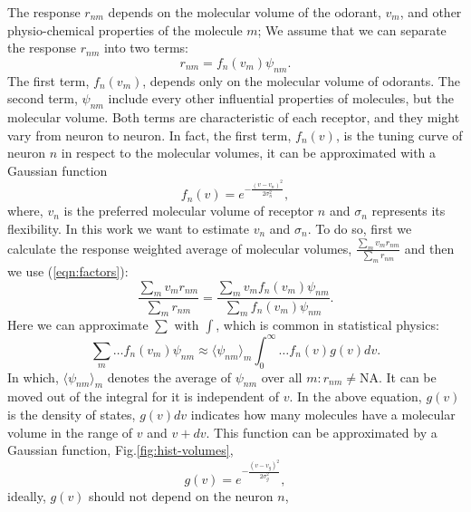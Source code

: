 \documentclass[11pt]{paper} %
\begin{document}
The response $r_{nm}$ depends on the molecular volume of the odorant, $v_m$, 
and other physio-chemical properties of the molecule $m$; 
We assume that we can separate the response $r_{nm}$ into two terms:
\begin{equation}
	r_{nm} = f_n(v_m) \psi_{nm}.
	\label{eqn:factors}
\end{equation}
The first term, $f_n(v_m)$, depends only on the molecular volume of odorants.
The second term, $\psi_{nm}$ include every other influential properties of molecules, but the molecular volume.
Both terms are characteristic of each receptor, and they might vary from neuron to neuron.
In fact, the first term, $f_n(v)$, is the tuning curve of neuron $n$ in respect to the molecular volumes, 
it can be approximated with a Gaussian function
\begin{equation}
	\displaystyle f_n(v) = e^{-\frac{(v-v_n)^2}{2\sigma^2_n}}, 
	\label{eqn:volume-dependence}
\end{equation}
where, $v_n$ is the preferred molecular volume of receptor $n$ and $\sigma_n$ represents its flexibility. 
In this work we want to estimate $v_n$ and $\sigma_n$. 
To do so, first we calculate the response weighted average of molecular volumes, 
$\frac{\sum_{m} v_m r_{nm}}{\sum_{m} r_{nm}}$ and then we use (\ref{eqn:factors}):
\begin{equation}
	\frac{\displaystyle \sum_{m} v_m r_{nm}}{\displaystyle \sum_{m} r_{nm}} = \frac{\displaystyle \sum_{m} v_m f_n(v_m) \psi_{nm}}{\displaystyle \sum_{m} f_n(v_m) \psi_{nm}}.
	\label{eqn:sta}
\end{equation}
Here we can approximate $\sum$ with $\int$, which is common in statistical physics:
\begin{equation}
	\sum_{m} \dots f_n(v_m) \psi_{nm} \approx  \langle \psi_{nm} \rangle_m \int_0^\infty \dots f_n(v) g(v)  dv. 
	\label{eqn:sigma_to_int}
\end{equation}
In which, 
$\langle \psi_{nm} \rangle_m$ denotes the average of $\psi_{nm}$ over all $m: r_{nm} \neq \text{NA}$. 
It can be moved out of the integral for it is independent of $v$.
In the above equation, 
$g(v)$ is the density of states, $g(v) dv$ indicates how many molecules have a molecular volume in the range of $v$ and $v+dv$.
This function can be approximated by a Gaussian function, Fig.\ref{fig:hist-volumes}, 
\begin{equation}
	g(v) = e^{-\frac{(v- v_{g})^2}{2 \sigma_{g}^2}},
	\label{eqn:hist-volumes}
\end{equation}
ideally, $g(v)$ should not depend on the neuron $n$, 
\end{document}
